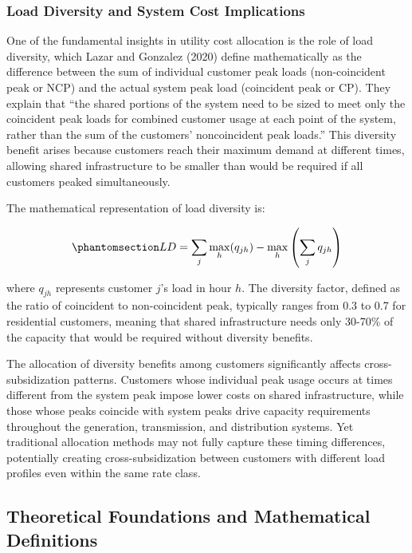 \documentclass[
  11pt,
]{article}
\begin{document}
\subsubsection{Load Diversity and System Cost
Implications}\label{load-diversity-and-system-cost-implications}

One of the fundamental insights in utility cost allocation is the role
of load diversity, which Lazar and Gonzalez (2020) define mathematically
as the difference between the sum of individual customer peak loads
(non-coincident peak or NCP) and the actual system peak load (coincident
peak or CP). They explain that ``the shared portions of the system need
to be sized to meet only the coincident peak loads for combined customer
usage at each point of the system, rather than the sum of the customers'
noncoincident peak loads.'' This diversity benefit arises because
customers reach their maximum demand at different times, allowing shared
infrastructure to be smaller than would be required if all customers
peaked simultaneously.

The mathematical representation of load diversity is:

\begin{equation}\phantomsection\label{eq-diversity}{LD = \sum_j \max_h(q_{jh}) - \max_h\left(\sum_j q_{jh}\right)}\end{equation}

where \(q_{jh}\) represents customer \(j\)'s load in hour \(h\). The
diversity factor, defined as the ratio of coincident to non-coincident
peak, typically ranges from 0.3 to 0.7 for residential customers,
meaning that shared infrastructure needs only 30-70\% of the capacity
that would be required without diversity benefits.

The allocation of diversity benefits among customers significantly
affects cross-subsidization patterns. Customers whose individual peak
usage occurs at times different from the system peak impose lower costs
on shared infrastructure, while those whose peaks coincide with system
peaks drive capacity requirements throughout the generation,
transmission, and distribution systems. Yet traditional allocation
methods may not fully capture these timing differences, potentially
creating cross-subsidization between customers with different load
profiles even within the same rate class.

\subsection{Theoretical Foundations and Mathematical
Definitions}\label{theoretical-foundations-and-mathematical-definitions}
\end{document}
